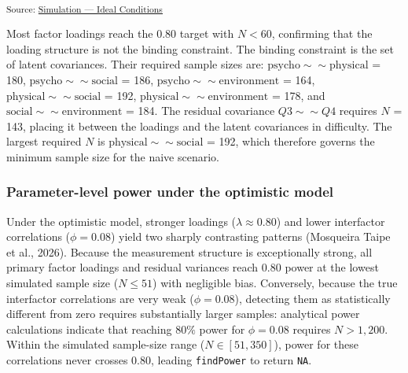 \documentclass[
  letterpaper,
  DIV=11,
  numbers=noendperiod]{scrartcl}
\begin{document}
\textsubscript{Source:
\href{https://phdpablo.github.io/cfa-power/Scripts/AnalysisScripts/03_simulation_ideal-preview.html\#cell-tbl-power-n-naive}{Simulation
--- Ideal Conditions}}

Most factor loadings reach the \(0.80\) target with \(N < 60\),
confirming that the loading structure is not the binding constraint. The
binding constraint is the set of latent covariances. Their required
sample sizes are: \(\text{psycho} \sim\sim \text{physical}\) = 180,
\(\text{psycho} \sim\sim \text{social}\) = 186,
\(\text{psycho} \sim\sim \text{environment}\) = 164,
\(\text{physical} \sim\sim \text{social}\) = 192,
\(\text{physical} \sim\sim \text{environment}\) = 178, and
\(\text{social} \sim\sim \text{environment}\) = 184. The residual
covariance \(Q3 \sim\sim Q4\) requires \(N\) = 143, placing it between
the loadings and the latent covariances in difficulty. The largest
required \(N\) is \(\text{physical} \sim\sim \text{social}\) = 192,
which therefore governs the minimum sample size for the naive scenario.

\subsubsection{Parameter-level power under the optimistic
model}\label{parameter-level-power-under-the-optimistic-model}

Under the optimistic model, stronger loadings (\(\lambda \approx 0.80\))
and lower interfactor correlations (\(\phi = 0.08\)) yield two sharply
contrasting patterns ({Mosqueira Taipe et al.}, 2026). Because the
measurement structure is exceptionally strong, all primary factor
loadings and residual variances reach \(0.80\) power at the lowest
simulated sample size (\(N \le 51\)) with negligible bias. Conversely,
because the true interfactor correlations are very weak
(\(\phi = 0.08\)), detecting them as statistically different from zero
requires substantially larger samples: analytical power calculations
indicate that reaching \(80\%\) power for \(\phi = 0.08\) requires
\(N > 1,200\). Within the simulated sample-size range
(\(N \in [51, 350]\)), power for these correlations never crosses
\(0.80\), leading \texttt{findPower} to return \texttt{NA}.
\end{document}

